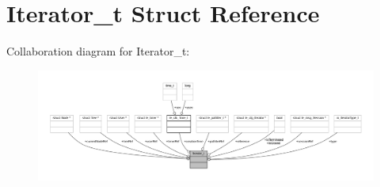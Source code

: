 \hypertarget{struct_iterator__t}{}\section{Iterator\+\_\+t Struct Reference}
\label{struct_iterator__t}


Collaboration diagram for Iterator\+\_\+t\+:
\nopagebreak
\begin{figure}[H]
\begin{center}
\leavevmode
\includegraphics[width=350pt]{struct_iterator__t__coll__graph}
\end{center}
\end{figure}
